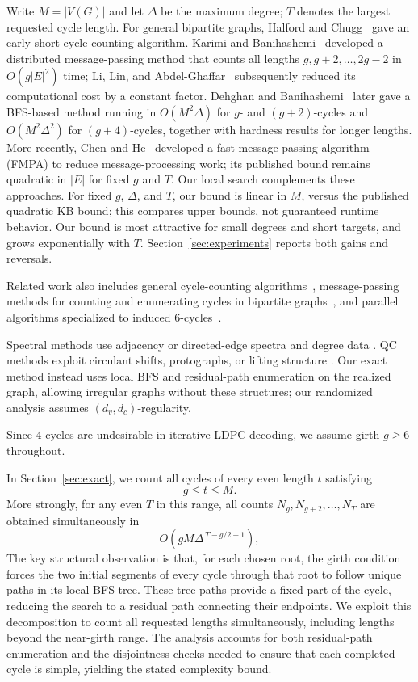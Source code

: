 \documentclass[conference]{IEEEtran}
\begin{document}
Write $M=|V(G)|$ and let $\Delta$ be the maximum degree;
$T$ denotes the largest requested cycle length.
For general bipartite graphs, Halford and Chugg~\cite{halford2006} gave an
early short-cycle counting algorithm. Karimi and
Banihashemi~\cite{karimi2013} developed a distributed message-passing method
that counts all lengths $g,g+2,\ldots,2g-2$ in $O(g|E|^2)$ time; Li, Lin,
and Abdel-Ghaffar~\cite{li2015} subsequently reduced its computational cost
by a constant factor. Dehghan and Banihashemi~\cite{dehghan2020} later gave
a BFS-based method running in $O(M^2\Delta)$ for $g$- and $(g+2)$-cycles
and $O(M^2\Delta^2)$ for $(g+4)$-cycles, together with hardness results for
longer lengths. More recently, Chen and He~\cite{chen2025fmpa}
developed a fast message-passing algorithm (FMPA) to reduce message-processing work; its published bound
remains quadratic in $|E|$ for fixed $g$ and $T$.
Our local search complements these approaches.
For fixed $g$, $\Delta$, and $T$, our bound is linear in $M$, versus the
published quadratic KB bound; this compares upper bounds, not guaranteed
runtime behavior. Our bound is most attractive for small degrees and
short targets, and grows exponentially with $T$.
Section~\ref{sec:experiments} reports both gains and reversals.

Related work also includes general cycle-counting
algorithms~\cite{alon1997}, message-passing methods for counting
and enumerating cycles in bipartite graphs~\cite{yang2017},
and parallel algorithms specialized to induced
$6$-cycles~\cite{niu2025}.

Spectral methods use adjacency or directed-edge spectra and degree data
\cite{blake2018,dehghan2019,dehghan2020directed}.
QC methods exploit circulant shifts, protographs, or lifting structure
\cite{fossorier2004,karimi2012qc,gomez2023}.
Our exact method instead uses local BFS and residual-path enumeration
on the realized graph, allowing irregular graphs without these structures;
our randomized analysis assumes $(d_v,d_c)$-regularity.

Since $4$-cycles are undesirable in iterative LDPC
decoding, we assume girth $g\ge6$ throughout.

In Section~\ref{sec:exact}, we count all cycles
of every even length $t$ satisfying
\begin{equation}\label{eq:range}
 g\le t\le M.
\end{equation}
More strongly, for any even $T$ in this range, all counts
$N_g,N_{g+2},\ldots,N_T$ are obtained simultaneously in
\begin{equation}\label{eq:maincomplexity}
 O\!\left(gM\Delta^{\,T-g/2+1}\right),
\end{equation}
The key structural observation is that, for each chosen root, the girth
condition forces the two initial segments of every cycle through that
root to follow unique paths in its local BFS tree. These tree paths
provide a fixed part of the cycle, reducing the search to a residual
path connecting their endpoints. We exploit this decomposition to count
all requested lengths simultaneously, including lengths beyond the
near-girth range. The analysis accounts for both residual-path
enumeration and the disjointness checks needed to ensure that each
completed cycle is simple, yielding the stated complexity bound.
\end{document}
